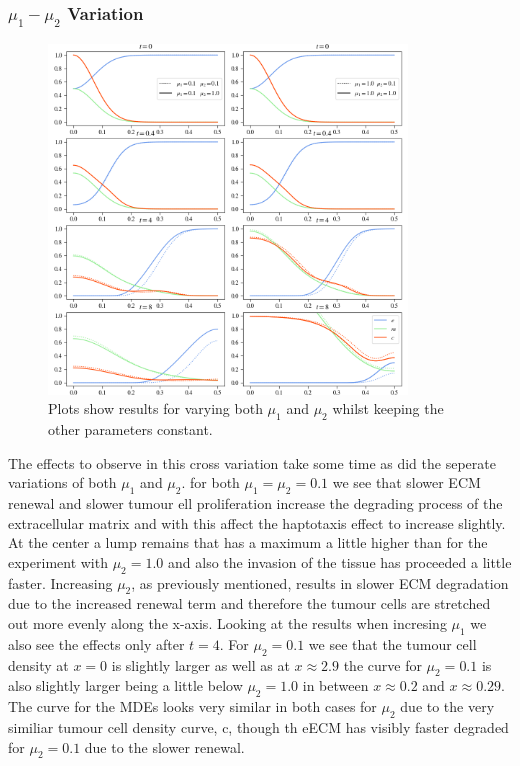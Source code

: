 \subsubsection*{$\mu_1 - \mu_2$ Variation}
\begin{figure}[h]
    \centering
    \includegraphics[width=0.85\textwidth]{resources/images/prolif_mu_1_mu_2_variation.png}
    \caption{Plots show results for varying both $\mu_1$ and $\mu_2$ whilst keeping the other parameters constant.}
    \label{fig:prolif_mu_1_mu_2_variation}
\end{figure}
The effects to observe in this cross variation take some time as did the seperate variations of both $\mu_1$ and $\mu_2$. for both $\mu_1=\mu_2=0.1$ we see that slower ECM renewal and slower tumour ell proliferation increase the degrading process of the extracellular matrix and with this affect the haptotaxis effect to increase slightly. At the center a lump remains that has a maximum a little higher than for the experiment with $\mu_2=1.0$ and also the invasion of the tissue has proceeded a little faster. Increasing $\mu_2$, as previously mentioned, results in slower ECM degradation due to the increased renewal term and therefore the tumour cells are stretched out more evenly along the x-axis. Looking at the results when incresing $\mu_1$ we also see the effects only after $t=4$. For $\mu_2=0.1$ we see that the tumour cell density at $x=0$ is slightly larger as well as at $x\approx 2.9$ the curve for $\mu_2=0.1$ is also slightly larger being a little below $\mu_2=1.0$ in between $x\approx 0.2$ and $x\approx 0.29$. The curve for the MDEs looks very similar in both cases for $\mu_2$ due to the very similiar tumour cell density curve, c, though th eECM has visibly faster degraded for $\mu_2=0.1$ due to the slower renewal.

